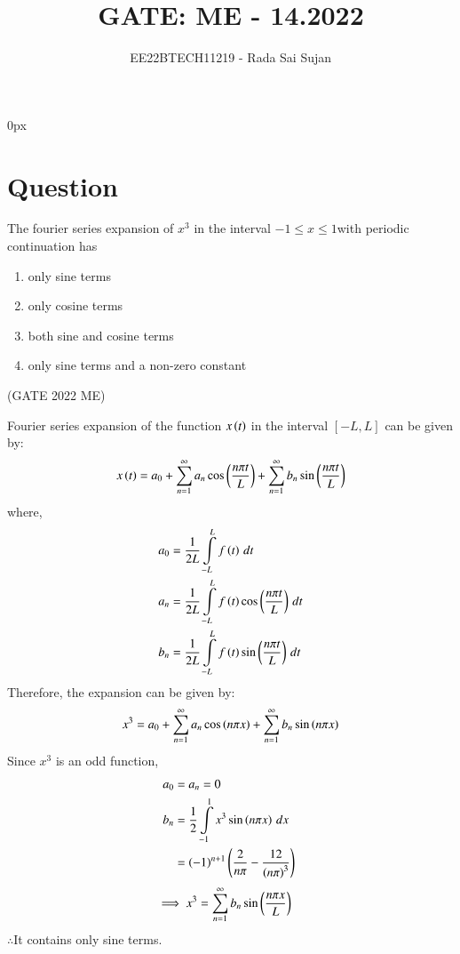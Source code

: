 \documentclass[journal,12pt,twocolumn]{IEEEtran}
\theoremstyle{remark}
\begin{document}
\parindent 0px

\title{GATE: ME - 14.2022}
\author{EE22BTECH11219 - Rada Sai Sujan$^{}$%
}
\maketitle
\newpage
\bigskip
\section*{Question}
The fourier series expansion of $x^3$ in the interval $-1\leq x\leq 1$with periodic continuation has
\begin{enumerate}[label=(\alph*)]
    \item only sine terms
    \item only cosine terms
    \item both sine and cosine terms
    \item only sine terms and a non-zero constant
\end{enumerate} \hfill(GATE 2022 ME)    \\
\solution

Fourier series expansion of the function $x\left(t\right)$ in the interval $[-L,L]$ can be given by: \\
\begin{align}
    x\left(t\right)=a_0+\sum\limits_{n=1}^{\infty}a_n\cos\left(\frac{n\pi t}{L}\right)+\sum\limits_{n=1}^{\infty}b_n\sin\left(\frac{n\pi t}{L}\right)
\end{align}
where,
\begin{align}
    a_0&=\frac{1}{2L}\int\limits_{-L}^{L}f\left(t\right)\,dt  \\
    a_n&=\frac{1}{2L}\int\limits_{-L}^{L}f\left(t\right)\cos\left(\frac{n\pi t}{L}\right)\,dt  \\
    b_n&=\frac{1}{2L}\int\limits_{-L}^{L}f\left(t\right)\sin\left(\frac{n\pi t}{L}\right)\,dt  \\
\end{align}
Therefore, the expansion can be given by:
\begin{align}
    x^3=a_0+\sum\limits_{n=1}^{\infty}a_n\cos\left(n\pi x\right)+\sum\limits_{n=1}^{\infty}b_n\sin\left(n\pi x\right)
\end{align}
Since $x^3$ is an odd function,
\begin{align}
    a_0&=a_n=0   \\
    b_n&=\frac{1}{2}\int\limits_{-1}^{1}x^3\sin\left(n\pi x\right)\,dx    \\
    &=\left(-1\right)^{n+1}\left(\frac{2}{n\pi}-\frac{12}{\left(n\pi\right)^3}\right) \
\end{align}
\begin{align}
    \implies x^3&=\sum\limits_{n=1}^{\infty}b_n\sin\left(\frac{n\pi x}{L}\right)
\end{align}
$\therefore$It contains only sine terms.
\end{document}

